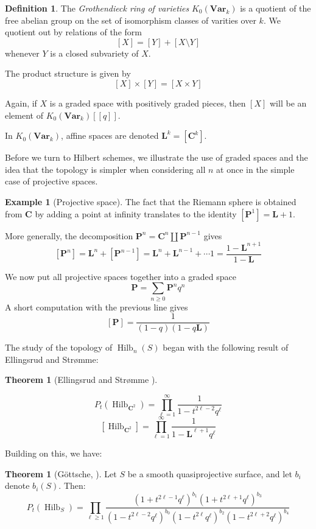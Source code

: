 \documentclass{amsart}[12pt]
\theoremstyle{definition}
\newtheorem{theorem}[dummy]{Theorem}
\newtheorem{example}[dummy]{Example}
\newtheorem{definition}[dummy]{Definition}
\newcommand{\C}{\mathbf{C}}
\newcommand{\LL}{\mathbf{L}}
\newcommand{\proj}{\mathbf{P}}
\newcommand{\Var}{\mathbf{Var}}
\DeclareMathOperator{\Hilb}{Hilb}
\newcommand{\HG}{\Hilb}
\begin{document}
\begin{definition}
The \emph{Grothendieck ring of varieties} $K_0(\Var_k)$ is a quotient of the free abelian group on the set of isomorphism classes of varities over $k$.  We quotient out by relations of the form
$$[X]=[Y]+[X\setminus Y]$$
whenever $Y$ is a closed subvariety of $X$.   

The product structure is given by
$$[X]\times [Y]=[X\times Y]$$

Again, if $X$ is a graded space with positively graded pieces, then $[X]$ will be an element of $K_0(\Var_k)[[q]]$.

In $K_0(\Var_k)$, affine spaces are denoted $\LL^k=[\C^k]$.

\end{definition}

Before we turn to Hilbert schemes, we illustrate the use of graded spaces and the idea that the topology is simpler when considering all $n$ at once in the simple case of projective spaces.


\begin{example}[Projective space]
The fact that the Riemann sphere is obtained from $\C$ by adding a point at infinity translates to the identity $[\proj^1]=\LL+1$.

More generally, the decomposition $\proj^n=\C^n\amalg \proj^{n-1}$ gives
$$[\proj^n]=\LL^n+[\proj^{n-1}]=\LL^n+\LL^{n-1}+\cdots 1=\frac{1-\LL^{n+1}}{1-\LL}$$


We now put all projective spaces together into a graded space 
$$\proj=\sum_{n\geq 0} \proj^nq^n$$ 
A short computation with the previous line gives
$$[\proj]=\frac{1}{(1-q)(1-q\LL)}$$

\end{example}


The study of the topology of $\Hilb_n(S)$ began with the following result of Ellingsrud and Str\o mme:
\begin{theorem}[Ellingsrud and Str\o mme \cite{ES}] \label{thm:ES}

$$P_t(\HG_{\C^2})=\prod_{\ell=1}^\infty \frac{1}{1-t^{2\ell-2}q^\ell}$$
$$[\HG_{\C^2}]=\prod_{\ell=1}^\infty \frac{1}{1-\LL^{\ell +1}q^\ell}$$
\end{theorem}

Building on this, we have:

\begin{theorem}[G\"ottsche, \cite{gottsche}] \label{thm:gprod}
Let $S$ be a smooth quasiprojective surface, and let $b_i$ denote $b_i(S)$.  Then:
$$P_t(\HG_S)=\prod_{\ell\geq 1} \frac{(1+t^{2\ell-1}q^\ell)^{b_1}(1+t^{2\ell+1}q^\ell)^{b_3}}{(1-t^{2\ell-2}q^\ell)^{b_0}(1-t^{2\ell}q^\ell)^{b_2}(1-t^{2\ell+2}q^\ell)^{b_4}}$$
\end{theorem}
\end{document}

